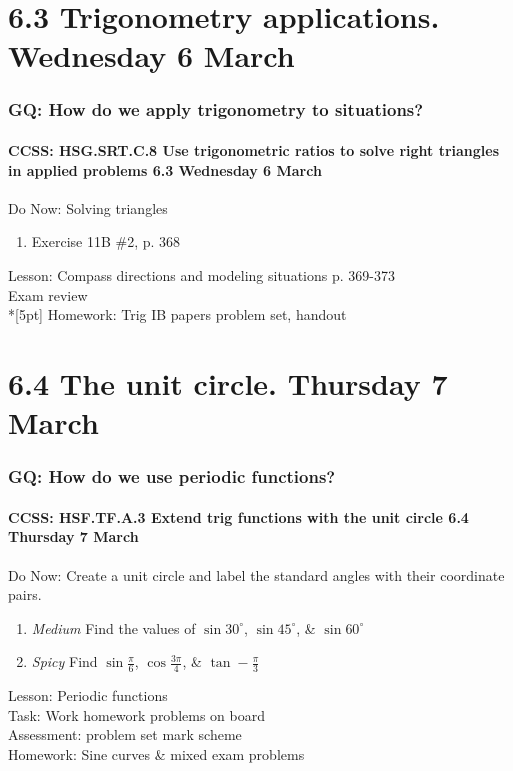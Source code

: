 \documentclass{beamer}
\begin{document}
\section{6.3 Trigonometry applications. Wednesday 6 March}
  \frame
  {
    \frametitle{GQ: How do we apply trigonometry to situations?}
    \framesubtitle{CCSS: HSG.SRT.C.8 Use trigonometric ratios to solve right triangles in applied problems \hfill \alert{6.3 Wednesday 6 March}}

    \begin{block}{Do Now: Solving triangles}
    \begin{enumerate}
        \item Exercise 11B \#2, p. 368
    \end{enumerate}
    \end{block}
    Lesson: Compass directions and modeling situations p. 369-373\\
    Exam review\\*[5pt]
    Homework: Trig IB papers problem set, handout
  }


\section{6.4 The unit circle. Thursday 7 March}
  \frame
  {
    \frametitle{GQ: How do we use periodic functions?}
    \framesubtitle{CCSS: HSF.TF.A.3 Extend trig functions with the unit circle  \hfill \alert{6.4 Thursday 7 March}}

      \begin{block}{Do Now: Create a unit circle and label the standard angles with their coordinate pairs.}
        \begin{enumerate}
            \item \emph{Medium} Find the values of $\sin 30^\circ$, $\sin 45^\circ$, \& $\sin 60^\circ$
            \item \emph{Spicy} Find $\sin \frac{\pi}{6}$, $\cos \frac{3\pi}{4}$, \& $\tan -\frac{\pi}{3}$
        \end{enumerate}
      \end{block}
    Lesson: Periodic functions\\%
    Task: Work homework problems on board\\%
    Assessment: problem set mark scheme\\%
    Homework: Sine curves \& mixed exam problems
  }
\end{document}
